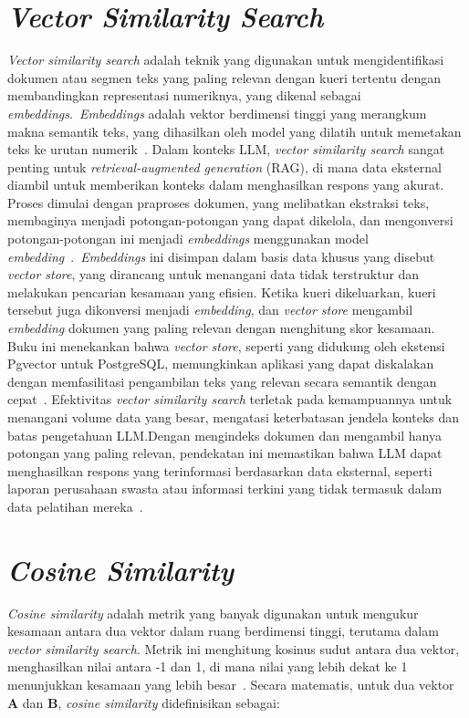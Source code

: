 \section{\emph{Vector Similarity Search}}
\emph{Vector similarity search} adalah teknik yang digunakan untuk mengidentifikasi dokumen atau segmen teks yang paling relevan dengan kueri tertentu dengan membandingkan representasi numeriknya, yang dikenal sebagai \emph{embeddings}.~\emph{Embeddings} adalah vektor berdimensi tinggi yang merangkum makna semantik teks, yang dihasilkan oleh model yang dilatih untuk memetakan teks ke urutan numerik~\cite{oshin2024learning}. Dalam konteks LLM, \emph{vector similarity search} sangat penting untuk \emph{retrieval-augmented generation} (RAG), di mana data eksternal diambil untuk memberikan konteks dalam menghasilkan respons yang akurat.
\singlespacing{}
Proses dimulai dengan praproses dokumen, yang melibatkan ekstraksi teks, membaginya menjadi potongan-potongan yang dapat dikelola, dan mengonversi potongan-potongan ini menjadi \emph{embeddings} menggunakan model \emph{embedding}~\cite{oshin2024learning}.~\emph{Embeddings} ini disimpan dalam basis data khusus yang disebut \emph{vector store}, yang dirancang untuk menangani data tidak terstruktur dan melakukan pencarian kesamaan yang efisien. Ketika kueri dikeluarkan, kueri tersebut juga dikonversi menjadi \emph{embedding}, dan \emph{vector store} mengambil \emph{embedding} dokumen yang paling relevan dengan menghitung skor kesamaan. Buku ini menekankan bahwa \emph{vector store}, seperti yang didukung oleh ekstensi Pgvector untuk PostgreSQL, memungkinkan aplikasi yang dapat diskalakan dengan memfasilitasi pengambilan teks yang relevan secara semantik dengan cepat~\cite{oshin2024learning}.
\singlespacing{}
Efektivitas \emph{vector similarity search} terletak pada kemampuannya untuk menangani volume data yang besar, mengatasi keterbatasan jendela konteks dan batas pengetahuan LLM.\@ Dengan mengindeks dokumen dan mengambil hanya potongan yang paling relevan, pendekatan ini memastikan bahwa LLM dapat menghasilkan respons yang terinformasi berdasarkan data eksternal, seperti laporan perusahaan swasta atau informasi terkini yang tidak termasuk dalam data pelatihan mereka~\cite{oshin2024learning}.

\section{\emph{Cosine Similarity}}
\emph{Cosine similarity} adalah metrik yang banyak digunakan untuk mengukur kesamaan antara dua vektor dalam ruang berdimensi tinggi, terutama dalam \emph{vector similarity search}. Metrik ini menghitung kosinus sudut antara dua vektor, menghasilkan nilai antara -1 dan 1, di mana nilai yang lebih dekat ke 1 menunjukkan kesamaan yang lebih besar~\cite{oshin2024learning}. Secara matematis, untuk dua vektor \( \mathbf{A} \) dan \( \mathbf{B} \), \emph{cosine similarity} didefinisikan sebagai:


